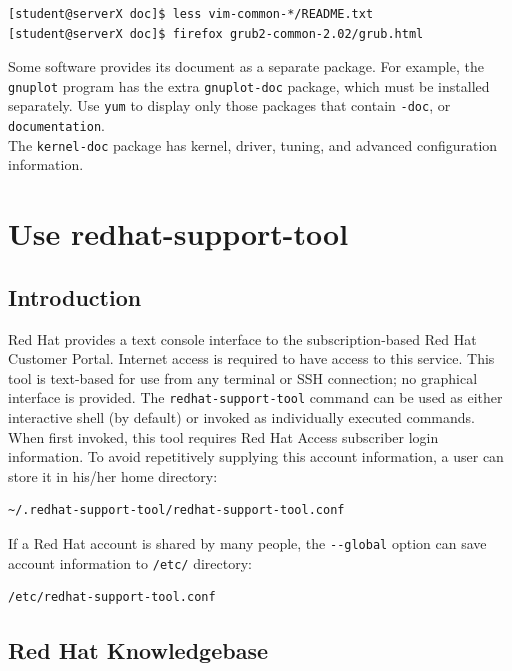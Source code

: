 \begin{verbatim}
[student@serverX doc]$ less vim-common-*/README.txt
[student@serverX doc]$ firefox grub2-common-2.02/grub.html
\end{verbatim}

Some software provides its document as a separate package. For example, the \verb|gnuplot| program has the extra \verb|gnuplot-doc| package, which must be installed separately. Use \verb|yum| to display only those packages that contain \verb|-doc|, or \verb|documentation|.\\

\note The \verb|kernel-doc| package has kernel, driver, tuning, and advanced configuration information.

\section{Use redhat-support-tool}

\subsection{Introduction}

Red Hat provides a text console interface to the subscription-based Red Hat Customer Portal. Internet access is required to have access to this service. This tool is text-based for use from any terminal or SSH connection; no graphical interface is provided. The \verb|redhat-support-tool| command can be used as either interactive shell (by default) or invoked as individually executed commands. When first invoked, this tool requires Red Hat Access subscriber login information. To avoid repetitively supplying this account information, a user can store it in his/her home directory:

\begin{verbatim}
~/.redhat-support-tool/redhat-support-tool.conf
\end{verbatim}

If a Red Hat account is shared by many people, the \verb|--global| option can save account information to \verb|/etc/| directory:

\begin{verbatim}
/etc/redhat-support-tool.conf
\end{verbatim}

\subsection{Red Hat Knowledgebase}

